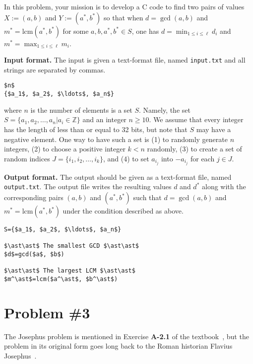 \documentclass{article}
\newcommand{\Z}{\mathbb{Z}}
\newcommand{\lcm}{{\mathrm{lcm}}}
\begin{document}
In this problem, your mission is to develop a C code to find two pairs of values $X:=(a,b)$ and $Y:=(a^\ast,b^\ast)$ so that
when $d=\gcd(a,b)$ and $m^\ast=\lcm(a^\ast,b^\ast)$ for some $a,b,a^\ast,b^\ast\in S$, 
one has $d=\displaystyle\min_{1\leq i\leq \ell}d_i$ and $m^\ast=\displaystyle\max_{1\leq i\leq \ell}m_i$.
 
\bigskip
\noindent\textbf{Input format.} %
The input is given a text-format file, named \texttt{input.txt} and all strings are separated by commas.
\begin{lstlisting}[backgroundcolor=\color{yellow!40}]
$n$
{$a_1$, $a_2$, $\ldots$, $a_n$} 
\end{lstlisting}
where $n$ is the number of elements is a set $S$.
Namely, the set $S=\{a_1,a_2,\ldots,a_n|a_i\in\Z\}$ and an integer $n\geq 10$.
We assume that every integer has the length of less than or equal to 32 bits, but note that $S$ may have a negative element.
One way to have such a set is (1) to randomly generate $n$ integers, (2) to choose a positive integer $k<n$ randomly,
(3) to create a set of random indices $J=\{i_1,i_2,\ldots,i_k\}$, and (4) to set $a_{i_j}$ into $-a_{i_j}$ for each $j\in J$.

 
\bigskip
\noindent\textbf{Output format.} %
The output should be given as a text-format file, named \texttt{output.txt}.
The output file writes the resulting  values $d$ and $d^\ast$ along with the corresponding pairs $(a,b)$ and $(a^\ast,b^\ast)$ such that
$d=\gcd(a,b)$ and $m^\ast=\lcm(a^\ast,b^\ast)$ under the condition described as above.
 
\begin{lstlisting}[backgroundcolor=\color{yellow!40}]
S={$a_1$, $a_2$, $\ldots$, $a_n$}

$\ast\ast$ The smallest GCD $\ast\ast$
$d$=gcd($a$, $b$)

$\ast\ast$ The largest LCM $\ast\ast$
$m^\ast$=lcm($a^\ast$, $b^\ast$)
\end{lstlisting}

%
% 
\newpage
\section{Problem \#3}

The Josephus problem is mentioned in  Exercise \textbf{A-2.1} of the textbook~\cite{GT15}, but 
the  problem in its original form goes long back to the Roman historian Flavius Josephus~\cite{Jos27}.
\end{document}
